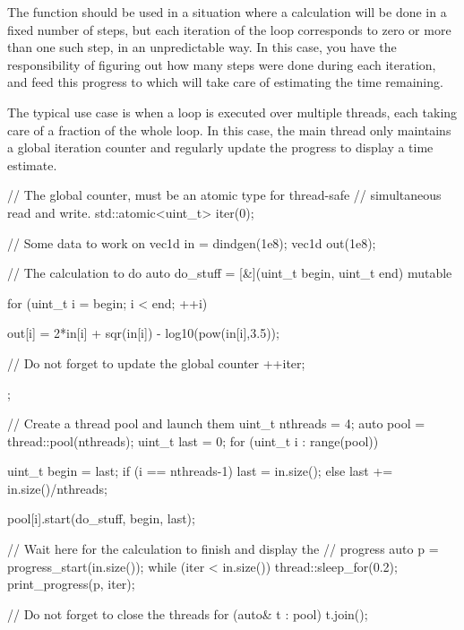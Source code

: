 \begin{advanced}
The function  should be used in a situation where a calculation will be done in a fixed number of steps, but each iteration of the loop corresponds to zero or more than one such step, in an unpredictable way. In this case, you have the responsibility of figuring out how many steps were done during each iteration, and feed this progress to  which will take care of estimating the time remaining.

The typical use case is when a loop is executed over multiple threads, each taking care of a fraction of the whole loop. In this case, the main thread only maintains a global iteration counter and regularly update the progress to display a time estimate.

\begin{example}
\begin{cppcode}
// The global counter, must be an atomic type for thread-safe
// simultaneous read and write.
std::atomic<uint_t> iter(0);

// Some data to work on
vec1d in = dindgen(1e8);
vec1d out(1e8);

// The calculation to do
auto do_stuff = [&](uint_t begin, uint_t end) mutable {
    for (uint_t i = begin; i < end; ++i) {
        out[i] = 2*in[i] + sqr(in[i]) - log10(pow(in[i],3.5));

        // Do not forget to update the global counter
        ++iter;
    }
};

// Create a thread pool and launch them
uint_t nthreads = 4;
auto pool = thread::pool(nthreads);
uint_t last = 0;
for (uint_t i : range(pool)) {
    uint_t begin = last;
    if (i == nthreads-1) {
        last = in.size();
    } else {
        last += in.size()/nthreads;
    }

    pool[i].start(do_stuff, begin, last);
}

// Wait here for the calculation to finish and display the
// progress
auto p = progress_start(in.size());
while (iter < in.size()) {
    thread::sleep_for(0.2);
    print_progress(p, iter);
}

// Do not forget to close the threads
for (auto& t : pool) {
    t.join();
}
\end{cppcode}
\end{example}
\end{advanced}
